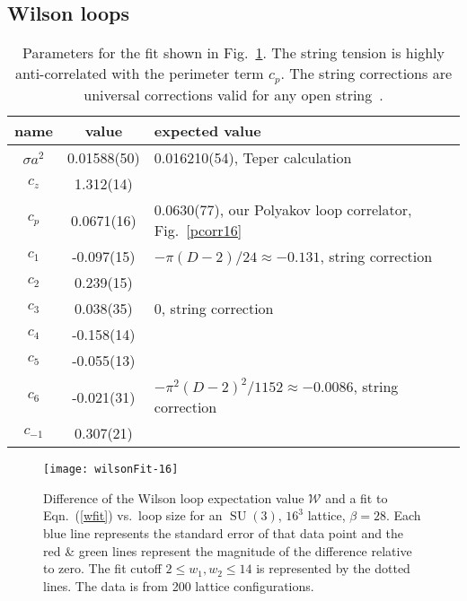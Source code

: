 \documentclass[preprint,aps,prd]{revtex4-2}
\DeclareMathOperator{\SU}{SU}
\newcommand{\cNorm}{c_z}
\begin{document}
\subsection{Wilson loops}

\begin{table}
  \caption{Parameters for the fit shown in Fig.~\ref{wilsonFit16}.
    The string tension is highly anti-correlated with the perimeter
    term $c_p$.  The string corrections are universal corrections
    valid for any open
    string~\cite{luscher_anomalies_1980,luscher_quark_2002,aharony_effective_2013}.
    \label{wilsonparameters}}
  \begin{tabular}{c|c|l}
    name & value & expected value\\
    \hline
  $\sigma a^2$ & 0.01588(50) & 0.016210(54), Teper calculation~\cite{lucini_$mathrmsun$_2002,athenodorou_sun_2017}.\\
  $\cNorm$ &  1.312(14) & \\
  $c_p$ &  0.0671(16) & 0.0630(77), our Polyakov loop correlator, Fig.~\ref{pcorr16}\\
  $c_1$ &  -0.097(15) & $-\pi (D-2)/24 \approx -0.131$, string correction\\
  $c_2$ &  0.239(15)\\
  $c_3$ &  0.038(35) & 0, string correction\\
  $c_4$ & -0.158(14) & \\
  $c_5$ & -0.055(13) &\\
  $c_6$ & -0.021(31) & $-\pi^2 (D-2)^2/1152 \approx -0.0086$, string correction\\
  $c_{-1}$ & 0.307(21) &\\
  \end{tabular}
\end{table}

\begin{figure}
  \texttt{[image: wilsonFit-16]}
  \caption{Difference of the Wilson loop expectation value $\mathcal{W}$
    and a fit to Eqn.~(\ref{wfit}) vs.\ loop size
    for an $\SU(3)$, $16^3$ lattice, $\beta=28$.  Each blue line represents
    the standard error of that data point and the red \& green lines
    represent the magnitude of the difference relative to zero.
    The fit cutoff $2 \le w_1,w_2\le 14$ is represented by the dotted lines.
    The data is from 200 lattice configurations. \label{wilsonFit16}}
\end{figure}
\end{document}
